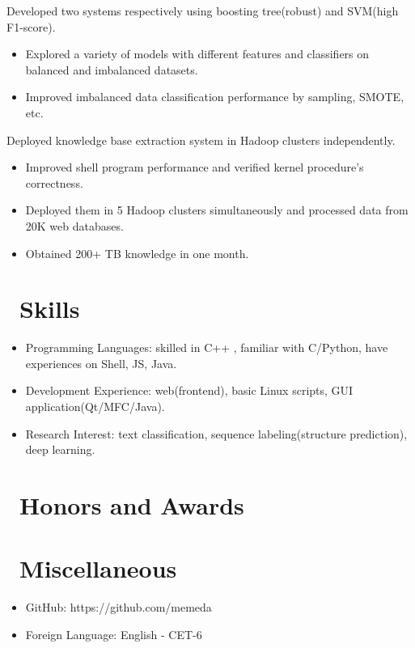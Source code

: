 \documentclass{resume}
\begin{document}
Developed two systems respectively using boosting tree(robust) and SVM(high F1-score).
\begin{itemize}
  \item Explored a variety of models with different features and classifiers on balanced and imbalanced datasets.
  \item Improved imbalanced data classification performance by sampling, SMOTE, etc.
\end{itemize}

Deployed knowledge base extraction system in Hadoop clusters independently.
\begin{itemize}
  \item Improved shell program performance and verified kernel procedure's correctness.
  \item Deployed them in 5 Hadoop clusters simultaneously and processed data from 20K web databases.
  \item Obtained 200+ TB knowledge in one month.
\end{itemize}


\section{\faCogs\ Skills}
\begin{itemize}[parsep=0.5ex]
  \item Programming Languages: skilled in C++ , familiar with C/Python, have experiences on Shell, JS, Java.
  \item Development Experience: web(frontend), basic Linux scripts, GUI application(Qt/MFC/Java).
  \item Research Interest: text classification, sequence labeling(structure prediction), deep learning.
\end{itemize}

\section{\faHeartO\ Honors and Awards}

\section{\faInfo\ Miscellaneous}
\begin{itemize}[parsep=0.5ex]
  \item GitHub: https://github.com/memeda
  \item Foreign Language: English - CET-6
\end{itemize}

%
%
\end{document}
